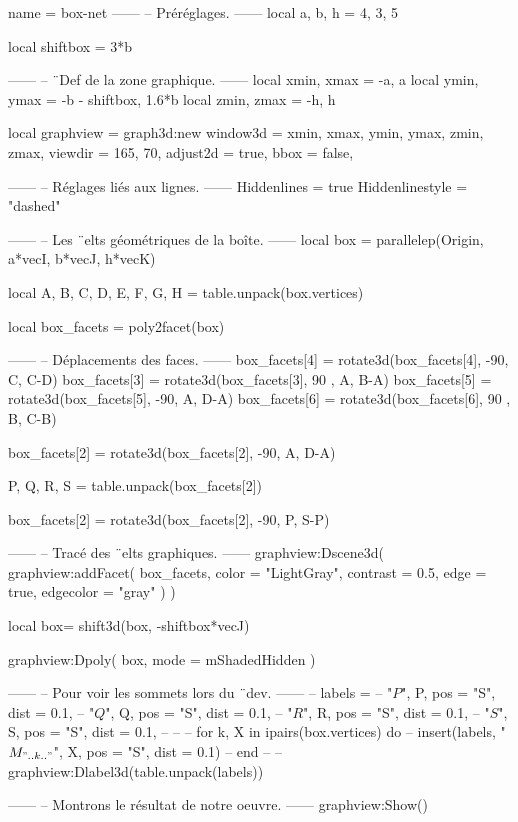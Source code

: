 \documentclass[border = 3pt]{standalone}
\begin{document}
\begin{luadraw*}{name = box-net}
------
-- Préréglages.
------
local a, b, h = 4, 3, 5

local shiftbox = 3*b

------
-- ¨Def de la zone graphique.
------
local xmin, xmax = -a, a
local ymin, ymax = -b - shiftbox, 1.6*b
local zmin, zmax = -h, h

local graphview = graph3d:new{
  window3d = {xmin, xmax, ymin, ymax, zmin, zmax},
  viewdir  = {165, 70},
  adjust2d = true,
  bbox     = false,
}

------
-- Réglages liés aux lignes.
------
Hiddenlines     = true
Hiddenlinestyle = "dashed"

------
-- Les ¨elts géométriques de la boîte.
------
local box = parallelep(Origin, a*vecI, b*vecJ, h*vecK)

local A, B, C, D, E, F, G, H = table.unpack(box.vertices)

local box_facets = poly2facet(box)

------
-- Déplacements des faces.
------
box_facets[4] = rotate3d(box_facets[4], -90, {C, C-D})
box_facets[3] = rotate3d(box_facets[3], 90 , {A, B-A})
box_facets[5] = rotate3d(box_facets[5], -90, {A, D-A})
box_facets[6] = rotate3d(box_facets[6], 90 , {B, C-B})

box_facets[2] = rotate3d(box_facets[2], -90, {A, D-A})

P, Q, R, S = table.unpack(box_facets[2])

box_facets[2] = rotate3d(box_facets[2], -90, {P, S-P})

------
-- Tracé des ¨elts graphiques.
------
graphview:Dscene3d(
  graphview:addFacet(
    box_facets,
    {
      color     = "LightGray",
      contrast  = 0.5,
      edge      = true,
      edgecolor = "gray"
    }
  )
)

local box= shift3d(box, -shiftbox*vecJ)

graphview:Dpoly(
  box,
  {mode = mShadedHidden}
)

------
-- Pour voir les sommets lors du ¨dev.
------
-- labels = {
--   "$P$", P, {pos = "S", dist = 0.1},
--   "$Q$", Q, {pos = "S", dist = 0.1},
--   "$R$", R, {pos = "S", dist = 0.1},
--   "$S$", S, {pos = "S", dist = 0.1},
-- }
--
-- for k, X in ipairs(box.vertices) do
--   insert(labels, {"$M_{".. k .."}$", X, {pos = "S", dist = 0.1}})
-- end
--
-- graphview:Dlabel3d(table.unpack(labels))

------
-- Montrons le résultat de notre oeuvre.
------
graphview:Show()
\end{luadraw*}
\end{document}

